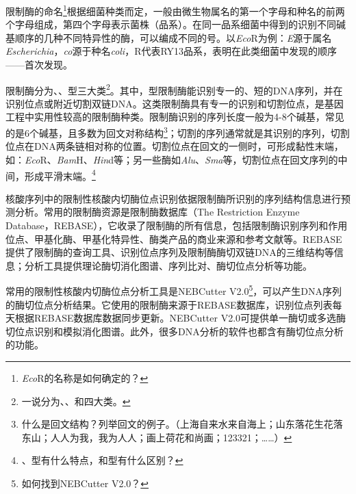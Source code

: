 \documentclass[11pt,a4paper,twoside]{book}
\begin{document}
限制酶的命名\footnote{\textit{Eco}R的名称是如何确定的？}根据细菌种类而定，一般由微生物属名的第一个字母和种名的前两个字母组成，第四个字母表示菌株（品系）。在同一品系细菌中得到的识别不同碱基顺序的几种不同特异性的酶，可以编成不同的号。以\textit{Eco}R为例：\textit{E}源于属名\textit{Escherichia}，\textit{co}源于种名\textit{coli}，R代表RY13品系，表明在此类细菌中发现的顺序——首次发现。

限制酶分为、、型三大类\footnote{一说分为、、和四大类。}。其中，型限制酶能识别专一的、短的DNA序列，并在识别位点或附近切割双链DNA。这类限制酶具有专一的识别和切割位点，是基因工程中实用性较高的限制酶种类。限制酶识别的序列长度一般为4-8个碱基，常见的是6个碱基，且多数为回文对称结构\footnote{什么是回文结构？列举回文的例子。（上海自来水来自海上；山东落花生花落东山；人人为我，我为人人；画上荷花和尚画；123321；……）}；切割的序列通常就是其识别的序列，切割位点在DNA两条链相对称的位置。切割位点在回文的一侧时，可形成黏性末端，如：\textit{Eco}R、\textit{Bam}H、\textit{Hin}d等；另一些酶如\textit{Alu}、\textit{Sma}等，切割位点在回文序列的中间，形成平滑末端。\footnote{、型有什么特点，和型有什么区别？}

核酸序列中的限制性核酸内切酶位点识别依据限制酶所识别的序列结构信息进行预测分析。常用的限制酶资源是限制酶数据库（The Restriction Enzyme Database，REBASE），它收录了限制酶的所有信息，包括限制酶识别序列和作用位点、甲基化酶、甲基化特异性、酶类产品的商业来源和参考文献等。REBASE提供了限制酶的查询工具、识别位点序列及限制酶酶切双链DNA的三维结构等信息；分析工具提供理论酶切消化图谱、序列比对、酶切位点分析等功能。

常用的限制性核酸内切酶位点分析工具是NEBCutter V2.0\footnote{如何找到NEBCutter V2.0？}，可以产生DNA序列的酶切位点分析结果。它使用的限制酶来源于REBASE数据库，识别位点列表每天根据REBASE数据库数据同步更新。NEBCutter V2.0可提供单一酶切或多选酶切位点识别和模拟消化图谱。此外，很多DNA分析的软件也都含有酶切位点分析的功能。
\end{document}
